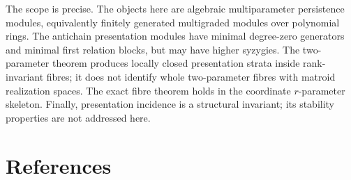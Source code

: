 \documentclass[11pt]{article}
\begin{document}
The scope is precise. The objects here are algebraic multiparameter persistence modules, equivalently finitely generated multigraded modules over polynomial rings. The antichain presentation modules have minimal degree-zero generators and minimal first relation blocks, but may have higher syzygies. The two-parameter theorem produces locally closed presentation strata inside rank-invariant fibres; it does not identify whole two-parameter fibres with matroid realization spaces. The exact fibre theorem holds in the coordinate \(r\)-parameter skeleton. Finally, presentation incidence is a structural invariant; its stability properties are not addressed here.

\section*{References}
\end{document}
